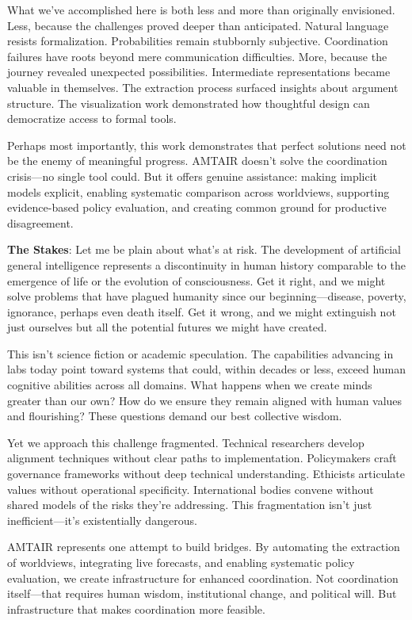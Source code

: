 \documentclass[
  11pt,
  letterpaper,
  openany]{book}
\begin{document}
What we've accomplished here is both less and more than originally
envisioned. Less, because the challenges proved deeper than anticipated.
Natural language resists formalization. Probabilities remain stubbornly
subjective. Coordination failures have roots beyond mere communication
difficulties. More, because the journey revealed unexpected
possibilities. Intermediate representations became valuable in
themselves. The extraction process surfaced insights about argument
structure. The visualization work demonstrated how thoughtful design can
democratize access to formal tools.

Perhaps most importantly, this work demonstrates that perfect solutions
need not be the enemy of meaningful progress. AMTAIR doesn't solve the
coordination crisis---no single tool could. But it offers genuine
assistance: making implicit models explicit, enabling systematic
comparison across worldviews, supporting evidence-based policy
evaluation, and creating common ground for productive disagreement.

\textbf{The Stakes}: Let me be plain about what's at risk. The
development of artificial general intelligence represents a
discontinuity in human history comparable to the emergence of life or
the evolution of consciousness. Get it right, and we might solve
problems that have plagued humanity since our beginning---disease,
poverty, ignorance, perhaps even death itself. Get it wrong, and we
might extinguish not just ourselves but all the potential futures we
might have created.

This isn't science fiction or academic speculation. The capabilities
advancing in labs today point toward systems that could, within decades
or less, exceed human cognitive abilities across all domains. What
happens when we create minds greater than our own? How do we ensure they
remain aligned with human values and flourishing? These questions demand
our best collective wisdom.

Yet we approach this challenge fragmented. Technical researchers develop
alignment techniques without clear paths to implementation. Policymakers
craft governance frameworks without deep technical understanding.
Ethicists articulate values without operational specificity.
International bodies convene without shared models of the risks they're
addressing. This fragmentation isn't just inefficient---it's
existentially dangerous.

AMTAIR represents one attempt to build bridges. By automating the
extraction of worldviews, integrating live forecasts, and enabling
systematic policy evaluation, we create infrastructure for enhanced
coordination. Not coordination itself---that requires human wisdom,
institutional change, and political will. But infrastructure that makes
coordination more feasible.
\end{document}
